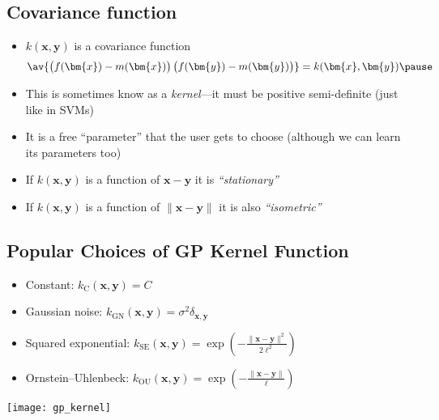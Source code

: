 
\begin{slide}
\section[-1]{Covariance function}

\begin{PauseHighLight}
  \begin{itemize}
  \item $k(\bm{x},\bm{y})$ is a covariance function
    \begin{align*}
      \av{\left(\strut f(\bm{x})-m(\bm{x})\right)
      \left(\strut f(\bm{y})-m(\bm{y})\right)} = k(\bm{x},\bm{y})\pause
    \end{align*}
  \item This is sometimes know as a \emph{kernel}\pause---it must be positive
    semi-definite\pause{} (just like in SVMs)\pauseb
  \item It is a free ``parameter'' that the user gets to choose (although we
    can learn its parameters too)\pause
  \item If $k(\bm{x},\bm{y})$ is a function of $\bm{x}-\bm{y}$ it is
    \emph{``stationary''}\pause
  \item If $k(\bm{x},\bm{y})$ is a function of $\|\bm{x}-\bm{y}\|$ it is
    also \emph{``isometric''}\pause
  \end{itemize}
\end{PauseHighLight}

\end{slide}


\begin{slide}
\section[-2]{Popular Choices of GP Kernel Function}

\begin{PauseHighLight}
  \begin{itemize}
  \item Constant: $\displaystyle k_{\operatorname{C} }(\bm{x},\bm{y})=C$\pause
  \item Gaussian noise: $\displaystyle k_{\operatorname{GN}}(\bm{x},\bm{y})
    =\sigma ^{2}\delta _{\bm{x},\bm{y}}$\pause
  \item Squared exponential: $\displaystyle 
    k_{\operatorname{SE}}(\bm{x},\bm{y})
    =\exp \!\left(-{\frac {\|\bm{x}-\bm{y}\|^{2}}{2\ell^{2}}}\right)$\pause
  \item Ornstein–Uhlenbeck: $\displaystyle 
    k_{\operatorname{OU} }(\bm{x},\bm{y})=\exp \! \left(-{\frac
        {\|\bm{x}-\bm{y}\|}{\ell}}\right)$\pause
  \end{itemize}
\end{PauseHighLight}
\begin{center}
  \texttt{[image: gp\_kernel]}
\end{center}

\end{slide}


